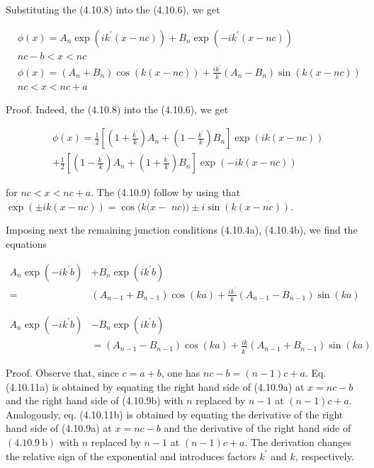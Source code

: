 \documentclass{article}
\begin{document}
Substituting the (4.10.8) into the (4.10.6), we get
 
\begin{align*}
& \phi(x)=A_{n} \exp \left(i k^{\prime}(x-n c)\right)+B_{n} \exp \left(-i k^{\prime}(x-n c)\right)  \tag{4.10.9a}\\
& n c-b<x<n c \\
& \phi(x)=\left(A_{n}+B_{n}\right) \cos (k(x-n c))+\frac{i k^{\prime}}{k}\left(A_{n}-B_{n}\right) \sin (k(x-n c))  \tag{4.10.9b}\\
& n c<x<n c+a
\end{align*}
 

Proof. Indeed, the (4.10.8) into the (4.10.6), we get
 
\begin{align*}
& \phi(x)=\frac{1}{2}\left[\left(1+\frac{k^{\prime}}{k}\right) A_{n}+\left(1-\frac{k^{\prime}}{k}\right) B_{n}\right] \exp (i k(x-n c))  \tag{4.10.10}\\
&+\frac{1}{2}\left[\left(1-\frac{k^{\prime}}{k}\right) A_{n}+\left(1+\frac{k^{\prime}}{k}\right) B_{n}\right] \exp (-i k(x-n c))
\end{align*}
 
for $n c<x<n c+a$. The (4.10.9) follow by using that $\exp ( \pm i k(x-n c))=\cos (k(x-$ $n c)) \pm i \sin (k(x-n c))$.

Imposing next the remaining junction conditions (4.10.4a), (4.10.4b), we find the equations
 
\begin{align*}
A_{n} \exp \left(-i k^{\prime} b\right) & +B_{n} \exp \left(i k^{\prime} b\right)  \tag{4.10.11a}\\
= & \left(A_{n-1}+B_{n-1}\right) \cos (k a)+\frac{i k^{\prime}}{k}\left(A_{n-1}-B_{n-1}\right) \sin (k a)
\end{align*}
 
 
\begin{align*}
A_{n} \exp \left(-i k^{\prime} b\right) & -B_{n} \exp \left(i k^{\prime} b\right)  \tag{4.10.11b}\\
& =\left(A_{n-1}-B_{n-1}\right) \cos (k a)+\frac{i k}{k^{\prime}}\left(A_{n-1}+B_{n-1}\right) \sin (k a)
\end{align*}
 

Proof. Observe that, since $c=a+b$, one has $n c-b=(n-1) c+a$. Eq. (4.10.11a) is obtained by equating the right hand side of (4.10.9a) at $x=n c-b$ and the right hand side of (4.10.9b) with $n$ replaced by $n-1$ at $(n-1) c+a$. Analogously, eq. (4.10.11b) is obtained by equating the derivative of the right hand side of (4.10.9a) at $x=n c-b$ and the derivative of the right hand side of $(4.10 .9 \mathrm{~b})$ with $n$ replaced by $n-1$ at $(n-1) c+a$. The derivation changes the relative sign of the exponential and introduces factors $k^{\prime}$ and $k$, respectively.
\end{document}
